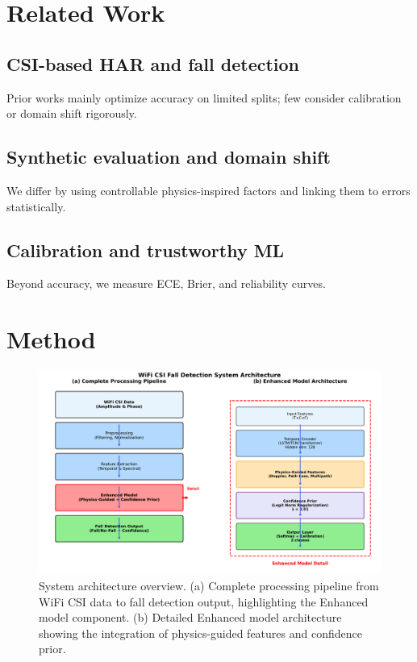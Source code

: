 \documentclass[10pt,conference]{IEEEtran}
\begin{document}
\section{Related Work}
\subsection{CSI-based HAR and fall detection}
Prior works mainly optimize accuracy on limited splits; few consider calibration or domain shift rigorously.
\subsection{Synthetic evaluation and domain shift}
We differ by using controllable physics-inspired factors and linking them to errors statistically.
\subsection{Calibration and trustworthy ML}
Beyond accuracy, we measure ECE, Brier, and reliability curves.

\section{Method}

\begin{figure}[t]
  \centering
  \includegraphics[width=\linewidth]{figures/fig2_flowchart.pdf}
  \caption{System architecture overview. (a) Complete processing pipeline from WiFi CSI data to fall detection output, highlighting the Enhanced model component. (b) Detailed Enhanced model architecture showing the integration of physics-guided features and confidence prior.}
  \label{fig:system-arch}
\end{figure}
\end{document}
